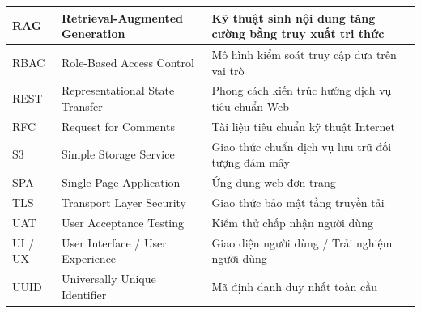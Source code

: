 \begin{xltabular}{\textwidth}{|l|l|X|}
RAG & Retrieval-Augmented Generation & Kỹ thuật sinh nội dung tăng cường bằng truy xuất tri thức \\ \hline
RBAC & Role-Based Access Control & Mô hình kiểm soát truy cập dựa trên vai trò \\ \hline
REST & Representational State Transfer & Phong cách kiến trúc hướng dịch vụ tiêu chuẩn Web \\ \hline
RFC & Request for Comments & Tài liệu tiêu chuẩn kỹ thuật Internet \\ \hline
S3 & Simple Storage Service & Giao thức chuẩn dịch vụ lưu trữ đối tượng đám mây \\ \hline
SPA & Single Page Application & Ứng dụng web đơn trang \\ \hline
TLS & Transport Layer Security & Giao thức bảo mật tầng truyền tải \\ \hline
UAT & User Acceptance Testing & Kiểm thử chấp nhận người dùng \\ \hline
UI / UX & User Interface / User Experience & Giao diện người dùng / Trải nghiệm người dùng \\ \hline
UUID & Universally Unique Identifier & Mã định danh duy nhất toàn cầu \\ \hline
\end{xltabular}
